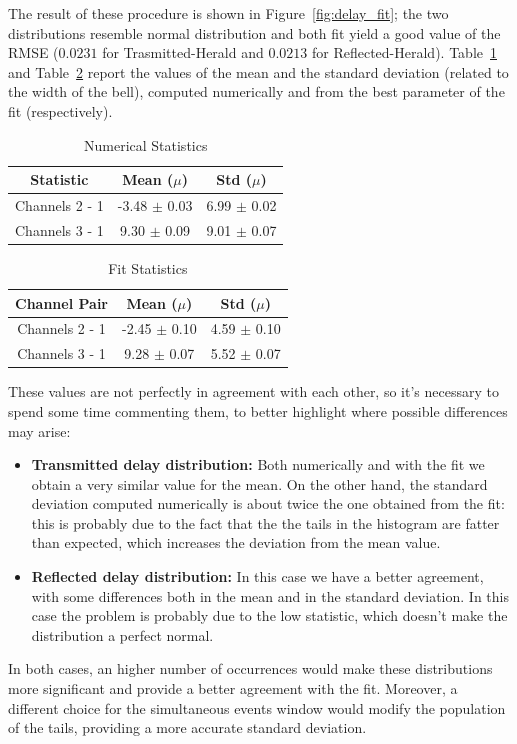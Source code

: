 \documentclass[prl,twocolumn]{revtex4-1}
\begin{document}
The result of these procedure is shown in Figure~\ref{fig:delay_fit}; the two distributions resemble normal distribution and both fit yield a good value of the RMSE ($0.0231$ for Trasmitted-Herald and $0.0213$ for Reflected-Herald). Table~\ref{tab:numerical} and Table~\ref{tab:fit} report the values of the mean and the standard deviation (related to the width of the bell), computed numerically and from the best parameter of the fit (respectively).
%
\begin{table}[b!]
    \centering
    \begin{tabular}{|c||c||c|}
        \hline
        \textbf{Statistic} & \textbf{Mean ($\mu$)} & \textbf{Std ($\mu$)} \\
        \hline
        \hline
        Channels 2 - 1 & -3.48 $\pm$ 0.03 & 6.99 $\pm$ 0.02 \\
        \hline
        Channels 3 - 1 & 9.30 $\pm$ 0.09 & 9.01 $\pm$ 0.07 \\
        \hline
    \end{tabular}
    \caption{Numerical Statistics}
    \label{tab:numerical}
\end{table}
%
\begin{table}[b!]
    \centering
    \begin{tabular}{|c||c||c|}
        \hline
        \textbf{Channel Pair} & \textbf{Mean ($\mu$)} & \textbf{Std ($\mu$)} \\
        \hline
        \hline
        Channels 2 - 1 & -2.45 $\pm$ 0.10 & 4.59 $\pm$ 0.10 \\
        \hline
        Channels 3 - 1 & 9.28 $\pm$ 0.07 & 5.52 $\pm$ 0.07 \\
        \hline
    \end{tabular}
    \caption{Fit Statistics}
    \label{tab:fit}
\end{table}

These values are not perfectly in agreement with each other, so it's necessary to spend some time commenting them, to better highlight where possible differences may arise: 
\begin{itemize}
    \item \textbf{Transmitted delay distribution:} Both numerically and with the fit we obtain a very similar value for the mean. On the other hand, the standard deviation computed numerically is about twice the one obtained from the fit: this is probably due to the fact that the the tails in the histogram are fatter than expected, which increases the deviation from the mean value.
    \item \textbf{Reflected delay distribution:} In this case we have a better agreement, with some differences both in the mean and in the standard deviation. In this case the problem is probably due to the low statistic, which doesn't make the distribution a perfect normal.
\end{itemize}
%
In both cases, an higher number of occurrences would make these distributions more significant and provide a better agreement with the fit. Moreover, a different choice for the simultaneous events window would modify the population of the tails, providing a more accurate standard deviation. 
\end{document}
